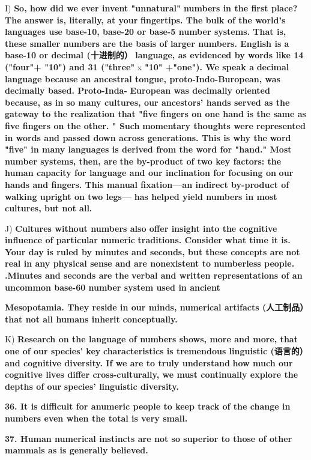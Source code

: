 \documentclass[UTF8,11pt]{ctexart}
\begin{document}
I) \textbf{So, how did we ever invent "unnatural" numbers in the first place? The answer is, literally, at your} \textbf{fingertips. The bulk of the world's languages use base-10, base-20 or base-5 number systems. That is,} \textbf{these smaller numbers are the basis of larger numbers. English is a base-10 or decimal (十进制的）} \textbf{language, as evidenced by words like 14 ("four"+ "10") and 31 ("three" }x \textbf{"10" +"one"). We speak a} \textbf{decimal language because an ancestral tongue, proto-Indo-Buropean, was decimally based. Proto-Inda-} \textbf{European was decimally oriented because, as in so many cultures, our ancestors' hands served as the} \textbf{gateway to the realization that "five fingers on one hand is the same as five fingers on the other. " Such} \textbf{momentary thoughts were represented in words and passed down across generations. This is why the} \textbf{word "five" in many languages is derived from the word for "hand." Most number systems, then, are} \textbf{the by-product of two key factors: the human capacity for language and our inclination for focusing on} \textbf{our hands and fingers. This manual fixation—an indirect by-product of walking upright on two legs—} \textbf{has helped yield numbers in most cultures, but not all.}


J) \textbf{Cultures without numbers also offer insight into the cognitive influence of particular numeric} \textbf{traditions. Consider what time it is. Your day is ruled by minutes and seconds, but these concepts are} \textbf{not real in any physical sense and are nonexistent to numberless people. .Minutes and seconds are the} \textbf{verbal and written representations of an uncommon base-60 number system used in ancient}


\textbf{Mesopotamia. They reside in our minds, numerical artifacts (人工制品）that not all humans inherit} \textbf{conceptually.}


K) \textbf{Research on the language of numbers shows, more and more, that one of our species' key} \textbf{characteristics is tremendous linguistic (语言的）and cognitive diversity. If we are to truly understand} \textbf{how much our cognitive lives differ cross-culturally, we must continually explore the depths of our} \textbf{species' linguistic diversity.}


\textbf{36. It is difficult for anumeric people to keep track of the change in numbers even when the total is very small.}


\textbf{37. Human numerical instincts are not so superior to those of other mammals as is generally believed.}
\end{document}
